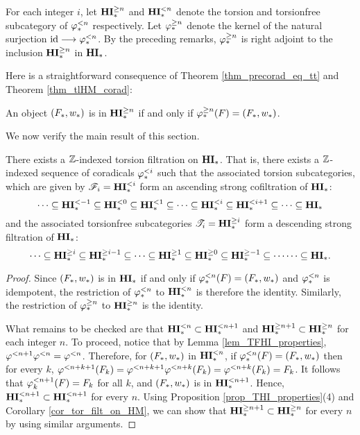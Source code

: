 \begin{defn}
For each integer $i$, let $\THM{n}$ and $\TFHM{n}$ denote the 
torsion and torsionfree subcategory of $\tlHM{n}$ respectively.
Let $\tgHM{n}$ denote the kernel of the natural surjection
$\id \to \tlHM{n}$. By the preceding remarks, $\tgHM{n}$ is right
adjoint to the inclusion $\THM{n}$ in $\HM$.
\end{defn}

Here is a straightforward consequence of Theorem
\ref{thm_precorad_eq_tt} and Theorem \ref{thm_tlHM_corad}:

\begin{cor}\label{cor_tgHM_prop}
An object $(F_*, \deloop_*)$ is in $\THM{n}$ if and only
if $\tgHM{n}(F) = (F_*, \deloop_*)$.
\end{cor}

We now verify the main result of this section.

\begin{cor}\label{cor_tor_filt_on_HM}
There exists a $\Z$-indexed torsion filtration on $\HM$. That 
is, there exists a $\Z$-indexed sequence of coradicals $\tlHM{i}$
such that the associated torsion subcategories, which are given
by $\Cat{F}_i = \TFHM{i}$
form an ascending strong cofiltration of $\HM$:
\[
\cdots \subseteq \TFHM{-1} \subseteq \TFHM{0} \subseteq \TFHM{1} \subseteq \cdots 
   \subseteq \TFHM{i} \subseteq \TFHM{i + 1} \subseteq \cdots 
   \subseteq \HM
\]
and the associated torsionfree subcategories $\Cat{T}_i = \THM{i}$
form a descending strong filtration of $\HM$:
\[
\cdots \subseteq \THM{i} \subseteq \THM{i - 1} \subseteq 
   \cdots \subseteq \THM{1} \subseteq \THM{0} \subseteq \THM{-1} \subseteq \cdots
   \cdots \subseteq \HM.
\]
\end{cor}
\begin{proof}
Since $(F_*, \deloop_*)$ is in $\HM$ if and only if $\tlHM{n}(F) =
(F_*, \deloop_*)$ and $\tlHM{n}$ is idempotent, the restriction
of $\tlHM{n}$ to $\TFHM{n}$ is therefore the identity. Similarly,
the restriction of $\tgHM{n}$ to $\THM{n}$ is the identity.

What remains to be checked are that $\TFHM{n} \subset \TFHM{n + 1}$
and $\THM{n + 1} \subset \THM{n}$ for each integer $n$. To 
proceed, notice that by Lemma \ref{lem_TFHI_properties}, 
$\tlHI{n + 1}\tlHI{n} = \tlHI{n}$. Therefore, for $(F_*, 
\deloop_*)$ in $\TFHM{n}$, if $\tlHM{n}(F) = (F_*, \deloop_*)$ 
then for every $k$, $\tlHI{n + k + 1}(F_k) = \tlHI{n + k + 1}\tlHI{n + k}(F_k) = 
\tlHI{n + k}(F_k) = F_k$. It follows that $\tlHM[k]{n + 1}(F) = 
F_k$ for all $k$, and $(F_*, \deloop_*)$ is in $\TFHM{n + 1}$.
Hence, $\TFHM{n + 1} \subset \TFHM{n + 1}$ for every $n$. Using 
Proposition \ref{prop_THI_properties}(4) and Corollary 
\ref{cor_tor_filt_on_HM}, we can show that $\THM{n + 1} \subset 
\THM{n}$ for every $n$ by using similar arguments.
\end{proof}

